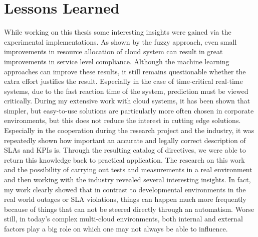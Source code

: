 \section{Lessons Learned}
While working on this thesis some interesting insights were gained via the experimental implementations. As shown by the fuzzy approach, even small improvements in resource allocation of cloud system can result in great improvements in service level compliance. Although the machine learning approaches can improve these results, it still remains questionable whether the extra effort justifies the result. Especially in the case of time-critical real-time systems, due to the fast reaction time of the system, prediction must be viewed critically. During my extensive work with cloud systems, it has been shown that simpler, but easy-to-use solutions are particularly more often chosen in corporate environments, but this does not reduce the interest in cutting edge solutions. Especially in the cooperation during the research project and the industry, it was repeatedly shown how important an accurate and legally correct description of SLAs and KPIs is. Through the resulting catalog of directives, we were able to return this knowledge back to practical application. The research on this work and the possibility of carrying out tests and measurements in a real environment and then working with the industry revealed several interesting insights. In fact, my work clearly showed that in contrast to developmental environments in the real world outages or SLA violations, things can happen much more frequently because of things that can not be steered directly through an automatism. Worse still, in today's complex multi-cloud environments, both internal and external factors play a big role on which one may not always be able to influence.



